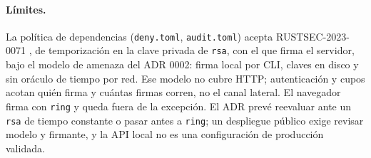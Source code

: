 \paragraph{Límites.}\label{sec:impl-limites-workspace}\label{tab:impl-limites-workspace} La política de dependencias (\texttt{deny.toml}, \texttt{audit.toml}) acepta RUSTSEC-2023-0071 \cite{rustsec2023_0071}, de temporización en la clave privada de \texttt{rsa}, con el que firma el servidor, bajo el modelo de amenaza del ADR 0002: firma local por CLI, claves en disco y sin oráculo de tiempo por red. Ese modelo no cubre HTTP; autenticación y cupos acotan quién firma y cuántas firmas corren, no el canal lateral. El navegador firma con \texttt{ring} y queda fuera de la excepción. El ADR prevé reevaluar ante un \texttt{rsa} de tiempo constante o pasar antes a \texttt{ring}; un despliegue público exige revisar modelo y firmante, y la API local no es una configuración de producción validada.

